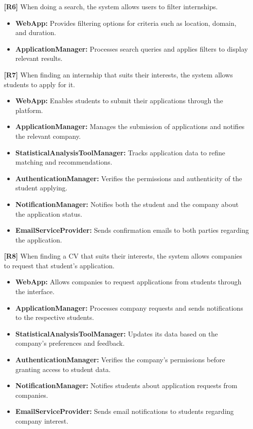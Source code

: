 \textbf{[R6]} When doing a search, the system allows users to filter internships.  
\begin{itemize}
    \item \textbf{WebApp:} Provides filtering options for criteria such as location, domain, and duration.
    \item \textbf{ApplicationManager:} Processes search queries and applies filters to display relevant results.
\end{itemize}

\textbf{[R7]} When finding an internship that suits their interests, the system allows students to apply for it.  
\begin{itemize}
    \item \textbf{WebApp:} Enables students to submit their applications through the platform.
    \item \textbf{ApplicationManager:} Manages the submission of applications and notifies the relevant company.
    \item \textbf{StatisticalAnalysisToolManager:} Tracks application data to refine matching and recommendations.
    \item \textbf{AuthenticationManager:} Verifies the permissions and authenticity of the student applying.
    \item \textbf{NotificationManager:} Notifies both the student and the company about the application status.
    \item \textbf{EmailServiceProvider:} Sends confirmation emails to both parties regarding the application.
\end{itemize}

\textbf{[R8]} When finding a CV that suits their interests, the system allows companies to request that student's application.  
\begin{itemize}
    \item \textbf{WebApp:} Allows companies to request applications from students through the interface.
    \item \textbf{ApplicationManager:} Processes company requests and sends notifications to the respective students.
    \item \textbf{StatisticalAnalysisToolManager:} Updates its data based on the company’s preferences and feedback.
    \item \textbf{AuthenticationManager:} Verifies the company's permissions before granting access to student data.
    \item \textbf{NotificationManager:} Notifies students about application requests from companies.
    \item \textbf{EmailServiceProvider:} Sends email notifications to students regarding company interest.
\end{itemize}

